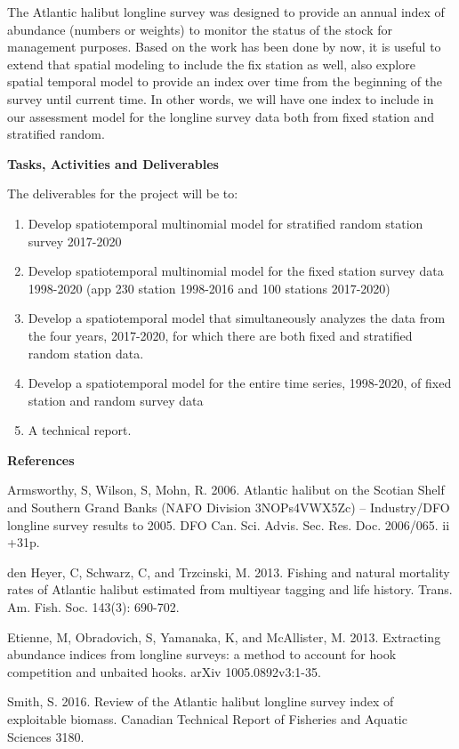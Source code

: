 \documentclass[12pt]{article}\usepackage[]{graphicx}\usepackage[]{color}
\begin{document}
\begin{appendices}
The Atlantic halibut longline survey was designed to provide an annual index of abundance (numbers or weights) to monitor the status of the stock for management purposes. Based on the work has been done by now, it is useful to extend that spatial modeling to include the fix station as well, also explore spatial temporal model to provide an index over time from the beginning of the survey until current time. In other words, we will have one index to include in our assessment model for the longline survey data both from fixed station and stratified random.

\textbf{Tasks, Activities and Deliverables}

The deliverables for the project will be to:
\begin{enumerate}
\def\labelenumi{\arabic{enumi})}
\item
  Develop spatiotemporal multinomial model for stratified random station survey 2017-2020
\item
  Develop spatiotemporal multinomial model for the fixed station survey data 1998-2020 (app 230 station 1998-2016 and 100 stations 2017-2020)
\item
  Develop a spatiotemporal model that simultaneously analyzes the data from the four years, 2017-2020, for which there are both fixed and stratified random station data.
\item
  Develop a spatiotemporal model for the entire time series, 1998-2020, of fixed station and random survey data
\item
  A technical report.
\end{enumerate}
\textbf{References}

Armsworthy, S, Wilson, S, Mohn, R. 2006. Atlantic halibut on the Scotian Shelf and Southern Grand Banks (NAFO Division 3NOPs4VWX5Zc) -- Industry/DFO longline survey results to 2005. DFO Can. Sci. Advis. Sec. Res. Doc. 2006/065. ii +31p.

den Heyer, C, Schwarz, C, and Trzcinski, M. 2013. Fishing and natural mortality rates of Atlantic halibut estimated from multiyear tagging and life history. Trans. Am. Fish. Soc. 143(3): 690-702.

Etienne, M, Obradovich, S, Yamanaka, K, and McAllister, M. 2013. Extracting abundance indices from longline surveys: a method to account for hook competition and unbaited hooks. arXiv 1005.0892v3:1-35.

Smith, S. 2016. Review of the Atlantic halibut longline survey index of exploitable biomass. Canadian Technical Report of Fisheries and Aquatic Sciences 3180.


\end{appendices}
\end{document}
